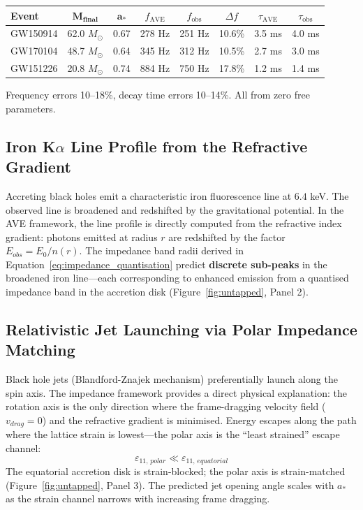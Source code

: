 \begin{center}
\renewcommand{\arraystretch}{1.3}
\begin{tabular}{l c c c c c c c}
\toprule
\textbf{Event} & $\mathbf{M_{final}}$ & $\mathbf{a_*}$ & \textbf{$f_\mathrm{AVE}$} & \textbf{$f_\mathrm{obs}$} & \textbf{$\Delta f$} & \textbf{$\tau_\mathrm{AVE}$} & \textbf{$\tau_\mathrm{obs}$} \\
\midrule
GW150914 & 62.0 $M_\odot$ & 0.67 & 278 Hz & 251 Hz & 10.6\% & 3.5 ms & 4.0 ms \\
GW170104 & 48.7 $M_\odot$ & 0.64 & 345 Hz & 312 Hz & 10.5\% & 2.7 ms & 3.0 ms \\
GW151226 & 20.8 $M_\odot$ & 0.74 & 884 Hz & 750 Hz & 17.8\% & 1.2 ms & 1.4 ms \\
\bottomrule
\end{tabular}
\end{center}
\noindent Frequency errors 10--18\%, decay time errors 10--14\%.  All from zero free parameters.

\subsection{Iron K$\alpha$ Line Profile from the Refractive Gradient}

Accreting black holes emit a characteristic iron fluorescence line at $6.4$ keV. The observed line is broadened and redshifted by the gravitational potential. In the AVE framework, the line profile is directly computed from the refractive index gradient: photons emitted at radius $r$ are redshifted by the factor $E_{obs} = E_0 / n(r)$. The impedance band radii derived in Equation~\ref{eq:impedance_quantisation} predict \textbf{discrete sub-peaks} in the broadened iron line---each corresponding to enhanced emission from a quantised impedance band in the accretion disk (Figure~\ref{fig:untapped}, Panel 2).

\subsection{Relativistic Jet Launching via Polar Impedance Matching}

Black hole jets (Blandford-Znajek mechanism) preferentially launch along the spin axis. The impedance framework provides a direct physical explanation: the rotation axis is the only direction where the frame-dragging velocity field ($v_{drag} = 0$) and the refractive gradient is minimised. Energy escapes along the path where the lattice strain is lowest---the polar axis is the ``least strained'' escape channel:
\begin{equation}
    \varepsilon_{11,\,polar} \ll \varepsilon_{11,\,equatorial}
\end{equation}
The equatorial accretion disk is strain-blocked; the polar axis is strain-matched (Figure~\ref{fig:untapped}, Panel 3). The predicted jet opening angle scales with $a_*$ as the strain channel narrows with increasing frame dragging.

